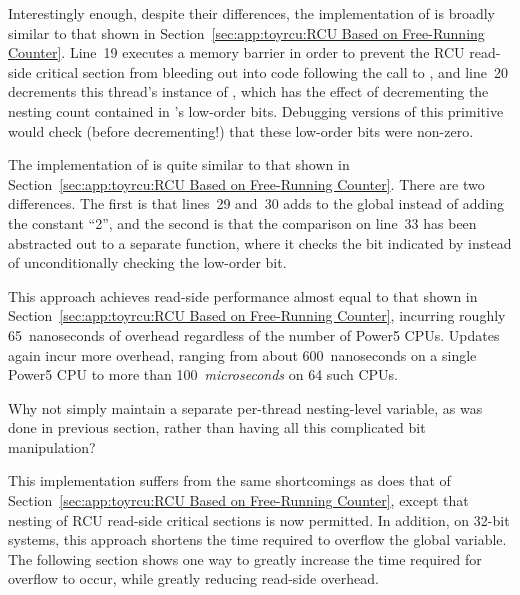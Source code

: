 Interestingly enough, despite their  differences,
the implementation of 
is broadly similar to that shown in
Section~\ref{sec:app:toyrcu:RCU Based on Free-Running Counter}.
Line~19 executes a memory barrier in order to prevent the RCU read-side
critical section from bleeding out into code following the call
to , and
line~20 decrements this thread's instance of ,
which has the effect of decrementing the nesting count contained in
's low-order bits.
Debugging versions of this primitive would check (before decrementing!)
that these low-order bits were non-zero.

The implementation of  is quite similar to
that shown in
Section~\ref{sec:app:toyrcu:RCU Based on Free-Running Counter}.
There are two differences.
The first is that lines~29 and~30 adds 
to the global  instead of adding the constant ``2'',
and the second is that the comparison on line~33 has been abstracted
out to a separate function, where it checks the bit indicated
by  instead of unconditionally checking
the low-order bit.

This approach achieves read-side performance almost equal to that
shown in
Section~\ref{sec:app:toyrcu:RCU Based on Free-Running Counter}, incurring
roughly 65~nanoseconds of overhead regardless of the number of
Power5 CPUs.
Updates again incur more overhead, ranging from about 600~nanoseconds on
a single Power5 CPU to more than 100~\emph{microseconds} on 64
such CPUs.

\QuickQuiz{}
	Why not simply maintain a separate per-thread nesting-level
	variable, as was done in previous section, rather than having
	all this complicated bit manipulation?
 \QuickQuizEnd

This implementation suffers from the same shortcomings as does that of
Section~\ref{sec:app:toyrcu:RCU Based on Free-Running Counter}, except that
nesting of RCU read-side critical sections is now permitted.
In addition, on 32-bit systems, this approach shortens the time
required to overflow the global  variable.
The following section shows one way to greatly increase the time
required for overflow to occur, while greatly reducing read-side
overhead.

